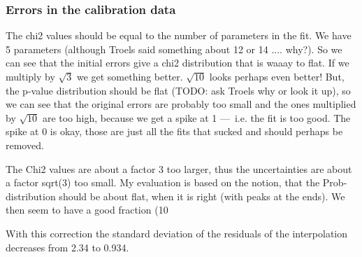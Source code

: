     \vspace{0.5cm}




    \subsubsection{Errors in the calibration data}


    The chi2 values should be equal to the number of parameters in the fit. We have 5 parameters (although Troels said something about 12 or 14 .... why?). So we can see that the initial errors give a chi2 distribution that is waaay to flat. If we multiply by $\sqrt{3}$ we get something better. $\sqrt{10}$ looks perhaps even better! But, the p-value distribution should be flat (TODO: ask Troels why or look it up), so we can see that the original errors are probably too small and the ones multiplied by $\sqrt{10}$ are too high, because we get a spike at 1 — i.e. the fit is too good. The spike at 0 is okay, those are just all the fits that sucked and should perhaps be removed. 

    The Chi2 values are about a factor 3 too larger, thus the uncertainties are about a factor sqrt(3) too small. My evaluation is based on the notion, that the Prob-distribution should be about flat, when it is right (with peaks at the ends). We then seem to have a good fraction (10%

    With this correction the standard deviation of the residuals of the interpolation decreases from 2.34 to 0.934.

